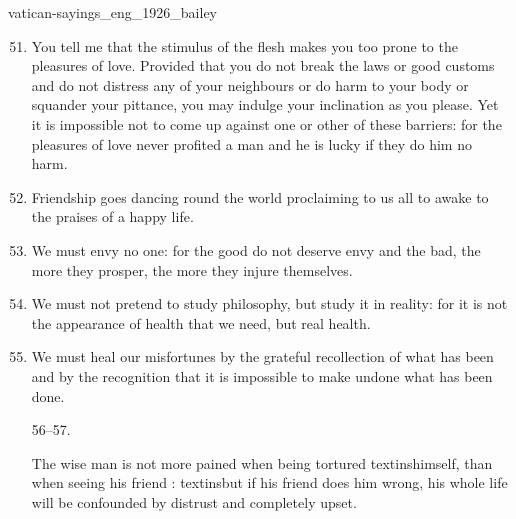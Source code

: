 \documentclass{stex}
\begin{document}
\begin{smodule}{vatican-sayings_eng_1926_bailey}
\begin{sparagraph}[id=vatican-sayings,name={Vatican Sayings}]
\begin{enumerate}[listparindent=0cm]
    \setcounter{enumi}{50}

    \item\begin{sparagraph}[id=saying:51,name=Vatican Saying 51]
      You tell me that the stimulus of the flesh makes you too prone to the pleasures of love.
      Provided that you do not break the laws or good customs and do not distress any of your neighbours or do harm to your body or squander your pittance, you may indulge your inclination as you please.
      Yet it is impossible not to come up against one or other of these barriers: for the pleasures of love never profited a man and he is lucky if they do him no harm.
    \end{sparagraph}

    \item\begin{sparagraph}[id=saying:52,name=Vatican Saying 52]
      Friendship goes dancing round the world proclaiming to us all to awake to the praises of a happy life.
    \end{sparagraph}

    \item\begin{sparagraph}[id=saying:53,name=Vatican Saying 53]
      We must envy no one: for the good do not deserve envy and the bad, the more they prosper, the more they injure themselves.
    \end{sparagraph}

    \item\begin{sparagraph}[id=saying:54,name=Vatican Saying 54]
      We must not pretend to study philosophy, but study it in reality: for it is not the appearance of health that we need, but real health.
    \end{sparagraph}

    \item\begin{sparagraph}[id=saying:55,name=Vatican Saying 55]
      We must heal our misfortunes by the grateful recollection of what has been and by the recognition that it is impossible to make undone what has been done.
    \end{sparagraph}

    \item[56--57.]\begin{sparagraph}[id=saying:56-57,name=Vatican Sayings 56--57]
      The wise man is not more pained when being tortured textins{himself, than when seeing} his friend : textins{but if his friend does him wrong}, his whole life will be confounded by distrust and completely upset.
    \end{sparagraph}


\end{enumerate}
\end{sparagraph}
\end{smodule}
\end{document}
